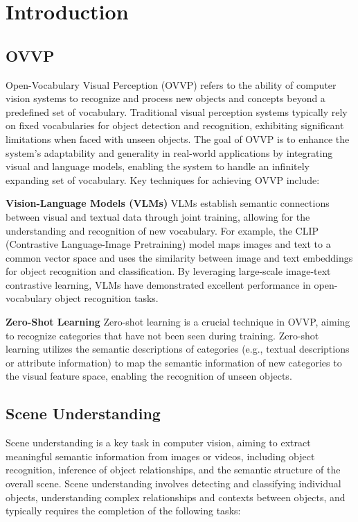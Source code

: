 \section{Introduction}
\label{sec:intro}

\subsection{OVVP}
Open-Vocabulary Visual Perception (OVVP) refers to the ability of computer vision systems to recognize and process new objects and concepts beyond a predefined set of vocabulary. Traditional visual perception systems typically rely on fixed vocabularies for object detection and recognition, exhibiting significant limitations when faced with unseen objects. The goal of OVVP is to enhance the system's adaptability and generality in real-world applications by integrating visual and language models, enabling the system to handle an infinitely expanding set of vocabulary. Key techniques for achieving OVVP include:


\textbf{Vision-Language Models (VLMs)}
VLMs establish semantic connections between visual and textual data through joint training, allowing for the understanding and recognition of new vocabulary. For example, the CLIP (Contrastive Language-Image Pretraining) model maps images and text to a common vector space and uses the similarity between image and text embeddings for object recognition and classification. By leveraging large-scale image-text contrastive learning, VLMs have demonstrated excellent performance in open-vocabulary object recognition tasks.

\textbf{Zero-Shot Learning}
Zero-shot learning is a crucial technique in OVVP, aiming to recognize categories that have not been seen during training. Zero-shot learning utilizes the semantic descriptions of categories (e.g., textual descriptions or attribute information) to map the semantic information of new categories to the visual feature space, enabling the recognition of unseen objects.



\subsection{Scene Understanding}


Scene understanding is a key task in computer vision, aiming to extract meaningful semantic information from images or videos, including object recognition, inference of object relationships, and the semantic structure of the overall scene. Scene understanding involves detecting and classifying individual objects, understanding complex relationships and contexts between objects, and typically requires the completion of the following tasks:


